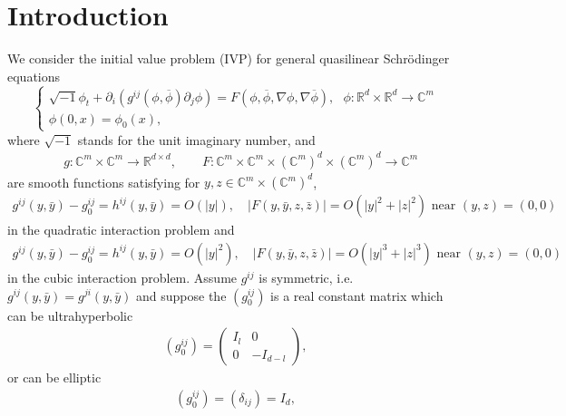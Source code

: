 \documentclass[10pt,twoside,a4paper]{article}
\numberwithin{equation}{section}\allowdisplaybreaks
\begin{document}
	\section{Introduction} \label{s1}			
We consider the initial value problem (IVP) for general quasilinear Schr\"odinger equations 
	\begin{equation}	 \label{qNLS}
	\begin{cases}
			\sqrt{-1}\phi_t+\partial_i\left( g^{ij}\left(\phi,\overline{\phi}\right) \partial_j \phi\right)=F\left(\phi,\overline{\phi},\nabla\phi, \nabla \overline{\phi}\right),~~~\phi: \mathbb{R}^d \times \mathbb{R}^d\rightarrow \mathbb{C}^m\\
			\phi(0,x)=\phi_0(x),
	\end{cases}
	\end{equation}
	where  $ \sqrt{-1} $  stands for the unit imaginary number, and
	\begin{align*}
			&g: \mathbb{C}^m \times \mathbb{C}^m   \rightarrow \mathbb{R}^{d \times d}, \qquad
			F: \mathbb{C}^m \times \mathbb{C}^m \times\left(\mathbb{C}^m\right)^d \times\left(\mathbb{C}^m\right)^d \rightarrow \mathbb{C}^m
	\end{align*}
are smooth functions  satisfying  for $y, z \in \mathbb{C}^m \times\left(\mathbb{C}^m\right)^d$, 
\begin{align} \label{qgF}
	g^{ij}(y,\bar{y})-g_0^{ij}=h^{ij}(y, \bar{y})=O\left(|y|\right), \quad|F(y, \bar{y},z,\bar{z})| = O\left(|y|^2+|z|^2\right) \text{   near   }(y, z)=(0,0)
\end{align}
in the quadratic interaction problem and
\begin{align} \label{cgF}
	g^{ij}(y,\bar{y})-g_0^{ij}=h^{ij}(y,\bar{y})=O\left(|y|^2\right), \quad |F(y,\bar{y}, z,\bar{z})|=O\left(|y|^3+|z|^3\right)
	\text{  near  }(y, z)=(0,0)
\end{align}
in the cubic interaction problem.  Assume 
$g^{ij}  $ is symmetric,  i.e. $ 	g^{ij}(y,\bar{y})= 	g^{ji}(y,\bar{y}) $ and suppose the  $ \left(g_0^{ij}\right) $ is a real constant matrix which can be ultrahyperbolic
\begin{align} \label{g0}
	\left(g_0^{ij}\right)=  \left(\begin{array}{cc}
	I_l &0\\
		0 & -I_{d-l}	
	\end{array}\right),
\end{align}
or can be elliptic 
\begin{align} \label{ellip_g}
\left(g_0^{ij}\right) = \left(	\delta_{i j}\right)  =I_d,
\end{align}
\end{document}
